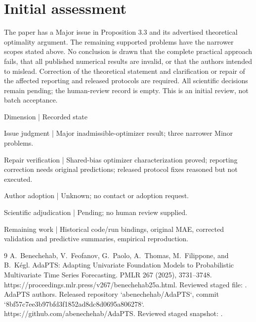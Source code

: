 \documentclass[10pt]{article}
\begin{document}
\section*{Initial assessment}
The paper has a Major issue in Proposition 3.3 and its advertised theoretical optimality argument. The remaining supported problems have the narrower scopes stated above. No conclusion is drawn that the complete practical approach fails, that all published numerical results are invalid, or that the authors intended to mislead. Correction of the theoretical statement and clarification or repair of the affected reporting and released protocols are required. All scientific decisions remain pending; the human-review record is empty. This is an initial review, not batch acceptance.\par
Dimension | Recorded state\par
Issue judgment | Major inadmissible-optimizer result; three narrower Minor problems.\par
Repair verification | Shared-bias optimizer characterization proved; reporting correction needs original predictions; released protocol fixes reasoned but not executed.\par
Author adoption | Unknown; no contact or adoption request.\par
Scientific adjudication | Pending; no human review supplied.\par
Remaining work | Historical code/run bindings, original MAE, corrected validation and predictive summaries, empirical reproduction.\par
9 A. Benechehab, V. Feofanov, G. Paolo, A. Thomas, M. Filippone, and B. Kégl. AdaPTS: Adapting Univariate Foundation Models to Probabilistic Multivariate Time Series Forecasting. PMLR 267 (2025), 3731–3748. https://proceedings.mlr.press/v267/benechehab25a.html. Reviewed staged file: . AdaPTS authors. Released repository `abenechehab/AdaPTS`, commit `8bf57c7ee3b97bfd3f1852ad8dc8d0695a806278`. https://github.com/abenechehab/AdaPTS. Reviewed staged snapshot: .\par
\end{document}
